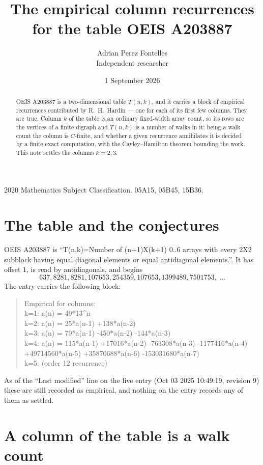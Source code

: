 \documentclass[11pt,a4paper]{article}
\title{The empirical column recurrences for the table OEIS A203887}
\author{Adrian Perez Fontelles\\ \small Independent researcher}
\date{1 September 2026}
\theoremstyle{plain}
\theoremstyle{definition}
\begin{document}
\maketitle

\begin{abstract}
OEIS A203887 is a two-dimensional table $T(n,k)$, and it carries a block of empirical
recurrences contributed by R.~H.~Hardin --- one for each of its first few columns. They are
true. Column $k$ of the table is an ordinary fixed-width array count, so its rows are the
vertices of a finite digraph and $T(n,k)$ is a number of walks in it; being a walk count the
column is $C$-finite, and whether a given recurrence annihilates it is decided by a finite
exact computation, with the Cayley--Hamilton theorem bounding the work. This note settles the
columns $k=2, 3$.
\end{abstract}

\noindent\small 2020 Mathematics Subject Classification. 05A15, 05B45, 15B36.\normalsize

\section{The table and the conjectures}

OEIS A203887 is ``T(n,k)=Number of (n+1)X(k+1) 0..6 arrays with every 2X2 subblock having equal diagonal elements or equal antidiagonal elements.''. It has offset $1$, is
read by antidiagonals, and begins
\[
637, 8281, 8281, 107653, 254359, 107653, 1399489, 7501753,\ \dots
\]
The entry carries the following block:
\begin{quote}\small
Empirical for columns:\\
k=1: a(n) = 49*13\^{}n\\
k=2: a(n) = 25*a(n-1) +138*a(n-2)\\
k=3: a(n) = 79*a(n-1) -450*a(n-2) -144*a(n-3)\\
k=4: a(n) = 115*a(n-1) +17016*a(n-2) -763308*a(n-3) -1177416*a(n-4) +49714560*a(n-5) +35870688*a(n-6) -153031680*a(n-7)\\
k=5: (order 12 recurrence)\\
\end{quote}
As of the ``Last modified'' line on the live entry (Oct 03 2025 10:49:19, revision 9) these are still
recorded as empirical, and nothing on the entry records any of them as settled.

\section{A column of the table is a walk count}
\end{document}
